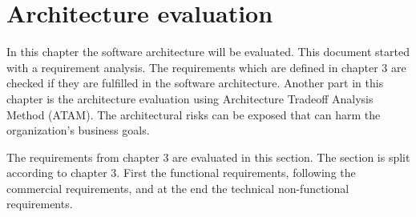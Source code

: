 \chapter{Architecture evaluation}
\label{ch:evaluation}
In this chapter the software architecture will be evaluated. This document started with a requirement analysis. The requirements which are defined in chapter 3 are checked if they are fulfilled in the software architecture. Another part in this chapter is the architecture evaluation using Architecture Tradeoff Analysis Method (ATAM). The architectural risks can be exposed that can harm the organization's business goals.

%
The requirements from chapter 3 are evaluated in this section. The section is split according to chapter 3. First  the functional requirements, following the commercial requirements, and at the end the technical non-functional requirements.

